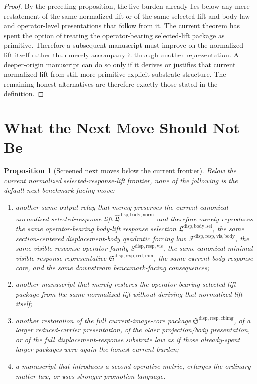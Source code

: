 \documentclass[11pt]{article}
\newcommand{\LiftSelectionPackage}{\mathfrak L^{\mathrm{disp,body,sel}}}
\newcommand{\NormalizedLiftPackage}{\widehat{\mathfrak L}^{\mathrm{disp,body,norm}}}
\newcommand{\VisibleBodyForcingLaw}{\mathscr F^{\mathrm{disp,resp,vis,body}}}
\newcommand{\VisibleResponseOperator}{S^{\mathrm{disp,resp,vis}}}
\newcommand{\MinimalReducedStructure}{\mathfrak S^{\mathrm{disp,resp,red,min}}}
\newcommand{\CurrentBodyImageCore}{\mathfrak S^{\mathrm{disp,resp,cbimg}}}
\newtheorem{proposition}{Proposition}
\begin{document}
\begin{proof}
By the preceding proposition, the live burden already lies below any mere restatement of the same normalized lift or of the same selected-lift and body-law and operator-level presentations that follow from it. The current theorem has spent the option of treating the operator-bearing selected-lift package as primitive. Therefore a subsequent manuscript must improve on the normalized lift itself rather than merely accompany it through another representation. A deeper-origin manuscript can do so only if it derives or justifies that current normalized lift from still more primitive explicit substrate structure. The remaining honest alternatives are therefore exactly those stated in the definition.
\end{proof}

\section{What the Next Move Should Not Be}

\begin{proposition}[Screened next moves below the current frontier]
Below the current normalized selected-response-lift frontier, none of the following is the default next benchmark-facing move:
\begin{enumerate}
    \item another same-output relay that merely preserves the current canonical normalized selected-response lift \(\NormalizedLiftPackage\) and therefore merely reproduces the same operator-bearing body-lift response selection \(\LiftSelectionPackage\), the same section-centered displacement-body quadratic forcing law \(\VisibleBodyForcingLaw\), the same visible-response operator family \(\VisibleResponseOperator\), the same canonical minimal visible-response representative \(\MinimalReducedStructure\), the same current body-response core, and the same downstream benchmark-facing consequences;
    \item another manuscript that merely restores the operator-bearing selected-lift package from the same normalized lift without deriving that normalized lift itself;
    \item another restoration of the full current-image-core package \(\CurrentBodyImageCore\), of a larger reduced-carrier presentation, of the older projection/body presentation, or of the full displacement-response substrate law as if those already-spent larger packages were again the honest current burden;
    \item a manuscript that introduces a second operative metric, enlarges the ordinary matter law, or uses stronger promotion language.
\end{enumerate}
\end{proposition}
\end{document}
